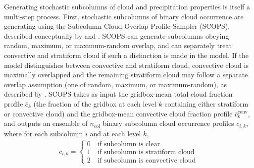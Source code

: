 Generating stochastic subcolumns of cloud and precipitation properties
is itself a multi-step process. First, stochastic subcolumns of binary
cloud occurrence are generating using the Subcolumn Cloud Overlap
Profile Sampler (SCOPS), described conceptually by
\citet{klein_and_jakob_1999} and \citet{webb_et_al_2001}. SCOPS can
generate subcolumns obeying random, maximum, or maximum-random overlap,
and can separately treat convective and stratiform cloud if such a
distinction is made in the model. If the model distinguishes between
convective and stratiform cloud, convective cloud is maximally
overlapped and the remaining stratiform cloud may follow a separate
overlap assumption (one of random, maximum, or maximum-random), as
described by \citet{webb_et_al_2001}. SCOPS takes as input the
gridbox-mean total cloud fraction profile \(\overline{c}_k\) (the
fraction of the gridbox at each level \(k\) containing either stratiform
or convective cloud) and the gridbox-mean convective cloud fraction
profile \(\overline{c}^\textrm{conv}_k\), and outputs an ensemble of
\(n_\textrm{col}\) binary subcolumn cloud occurrence profiles
\(c_{i, k}\), where for each subcolumn \(i\) and at each level \(k\),
\[\begin{gathered} 
    c_{i, k} = \begin{cases} 
        0 & ~\text{if subcolumn is clear} \\ 
        1 & ~\text{if subcolumn is stratiform cloud} \\ 
        2 & ~\text{if subcolumn is convective cloud} 
    \end{cases}
\end{gathered}\]

